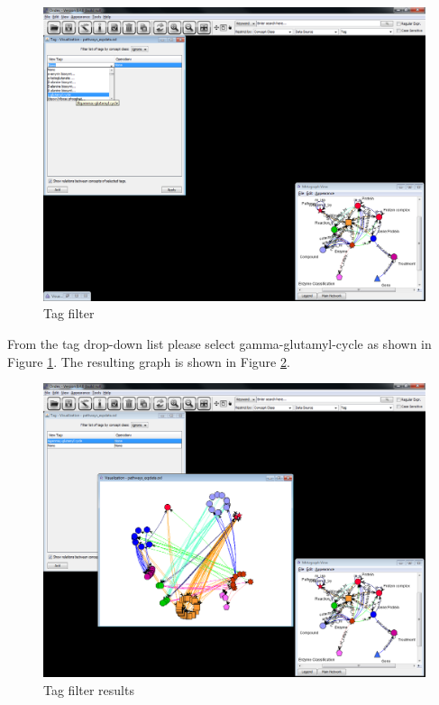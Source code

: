 \begin{figure}[H]
\centering
\includegraphics[scale=0.35]{images/Oct12/app1fig3.png} 
\caption{Tag filter}
\label{fig:tag_filter}
\end{figure}

From the tag drop-down list please select gamma-glutamyl-cycle as shown in Figure \ref{fig:tag_filter}.
The resulting graph is shown in Figure \ref{fig:tag_result}.

\begin{figure}[H]
\centering
\includegraphics[scale=0.35]{images/Oct12/app1fig4.png} 
\caption{Tag filter results}
\label{fig:tag_result}
\end{figure}

